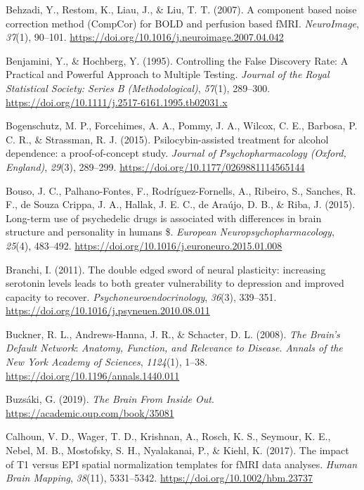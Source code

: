 \begin{CSLReferences}{1}{0}
Behzadi, Y., Restom, K., Liau, J., \& Liu, T. T. (2007). A component
based noise correction method (CompCor) for BOLD and perfusion based
fMRI. \emph{NeuroImage}, \emph{37}(1), 90--101.
\url{https://doi.org/10.1016/j.neuroimage.2007.04.042}

Benjamini, Y., \& Hochberg, Y. (1995). Controlling the False Discovery
Rate: A Practical and Powerful Approach to Multiple Testing.
\emph{Journal of the Royal Statistical Society: Series B
(Methodological)}, \emph{57}(1), 289--300.
\url{https://doi.org/10.1111/j.2517-6161.1995.tb02031.x}

Bogenschutz, M. P., Forcehimes, A. A., Pommy, J. A., Wilcox, C. E.,
Barbosa, P. C. R., \& Strassman, R. J. (2015). Psilocybin-assisted
treatment for alcohol dependence: a proof-of-concept study.
\emph{Journal of Psychopharmacology (Oxford, England)}, \emph{29}(3),
289--299. \url{https://doi.org/10.1177/0269881114565144}

Bouso, J. C., Palhano-Fontes, F., Rodríguez-Fornells, A., Ribeiro, S.,
Sanches, R. F., de Souza Crippa, J. A., Hallak, J. E. C., de Araújo, D.
B., \& Riba, J. (2015). Long-term use of psychedelic drugs is associated
with differences in brain structure and personality in humans \$.
\emph{European Neuropsychopharmacology}, \emph{25}(4), 483--492.
\url{https://doi.org/10.1016/j.euroneuro.2015.01.008}

Branchi, I. (2011). The double edged sword of neural plasticity:
increasing serotonin levels leads to both greater vulnerability to
depression and improved capacity to recover.
\emph{Psychoneuroendocrinology}, \emph{36}(3), 339--351.
\url{https://doi.org/10.1016/j.psyneuen.2010.08.011}

Buckner, R. L., Andrews-Hanna, J. R., \& Schacter, D. L. (2008).
\emph{The Brain's Default Network}: \emph{Anatomy, Function, and
Relevance to Disease}. \emph{Annals of the New York Academy of
Sciences}, \emph{1124}(1), 1--38.
\url{https://doi.org/10.1196/annals.1440.011}

Buzsáki, G. (2019). \emph{The Brain From Inside Out}.
\url{https://academic.oup.com/book/35081}

Calhoun, V. D., Wager, T. D., Krishnan, A., Rosch, K. S., Seymour, K.
E., Nebel, M. B., Mostofsky, S. H., Nyalakanai, P., \& Kiehl, K. (2017).
The impact of T1 versus EPI spatial normalization templates for fMRI
data analyses. \emph{Human Brain Mapping}, \emph{38}(11), 5331--5342.
\url{https://doi.org/10.1002/hbm.23737}


\end{CSLReferences}
